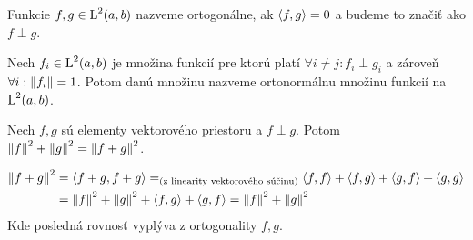 
\begin{definicia}
 Funkcie $f,g \in \mbox{L}^2(a,b)$ nazveme ortogonálne, ak
 $\left\langle f,g \right\rangle=0$ a budeme to značiť ako $f\perp g$.
\end{definicia}

\begin{definicia}
    Nech $f_i \in \mbox{L}^2(a,b)$ je množina funkcií pre ktorú platí
    $\forall i\not=j: f_i \perp g_i$ a zároveň
    $\forall i: \left\lVert f_i\right\rVert=1$. Potom danú množinu nazveme ortonormálnu
    množinu funkcií na $\mbox{L}^2(a,b)$.
\end{definicia}

\begin{lema}
    Nech $f,g$ sú elementy vektorového priestoru a
    $f\perp g$.
    Potom $\left\lVert f\right\rVert^2 + \left\lVert g\right\rVert^2 = \left\lVert f+g\right\rVert^2$.
\end{lema}
\begin{dokaz}
    \begin{equation*}
    \begin{split}
        \left\lVert f+g\right\rVert^2 &= \left\langle f+g,f+g \right\rangle =
            _\text{(z linearity vektorového súčinu)}
        \left\langle f,f \right\rangle + \left\langle f,g \right\rangle + \left\langle g,f \right\rangle + \left\langle g,g \right\rangle \\
        &=
        \left\lVert f\right\rVert^2 + \left\lVert g\right\rVert^2 + \left\langle f,g \right\rangle + \left\langle g,f \right\rangle = 
        \left\lVert f\right\rVert^2 + \left\lVert g\right\rVert^2
    \end{split}
    \end{equation*}
    Kde posledná rovnosť vyplýva z ortogonality $f,g$.
\end{dokaz}

